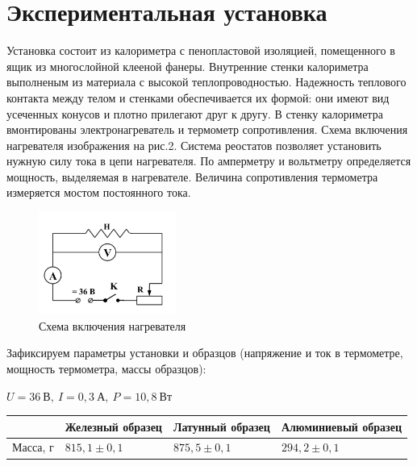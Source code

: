 \documentclass[12pt,a4paper]{article}
\begin{document}
\section{Экспериментальная установка}
 
Установка состоит из калориметра с пенопластовой изоляцией, помещенного в ящик из многослойной клееной фанеры. Внутренние стенки калориметра выполненым из материала с высокой теплопроводностью. Надежность теплового контакта между телом и стенками обеспечивается их формой: они имеют вид усеченных конусов и плотно прилегают друг к другу. В стенку калориметра вмонтированы электронагреватель и термометр сопротивления. Схема включения нагревателя изображения на рис.2. Система реостатов позволяет установить нужную силу тока в цепи нагревателя. По амперметру и вольтметру определяется мощность, выделяемая в нагревателе. Величина сопротивления термометра измеряется мостом постоянного тока.

\begin{figure}[!h]
	\centering
	\includegraphics[width=0.4\textwidth]{pic2.png}
	\caption{Схема включения нагревателя}
	\label{fig:boiler}
\end{figure}

Зафиксируем параметры установки и образцов (напряжение и ток в термометре, мощность термометра, массы образцов):

$U = 36~\text{В},~ I = 0,3~\text{А},~ P = 10,8~\text{Вт}$
\begin{table}[!h]
	\centering
	\begin{tabular}{|l|l|l|l|}
		\hline
	& Железный образец	& Латунный образец & Алюминиевый образец \\ \hline
		Масса, г & $815,1\pm0,1$   & $875,5\pm0,1$      & $294,2\pm0,1$           \\ \hline
	\end{tabular}
\end{table}
 
\end{document}
